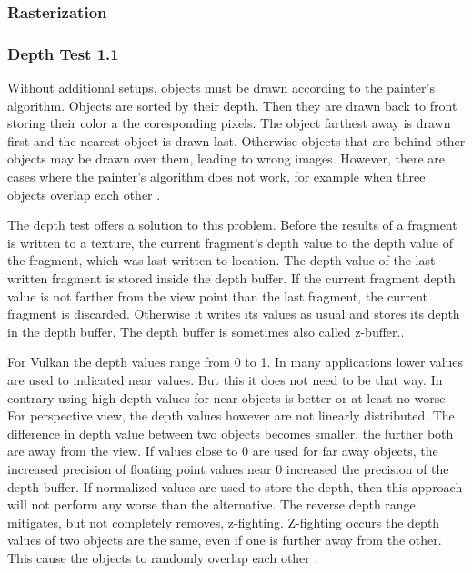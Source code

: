 \subsubsection{Rasterization}

\subsubsection{Depth Test 1.1}
\label{section:depthtest}
Without additional setups, objects must be drawn according to the painter's algorithm. Objects are sorted by their depth. Then they are drawn back to front storing their color a the coresponding pixels. The object farthest away is drawn first and the nearest object is drawn last. Otherwise objects that are behind other objects may be drawn over them, leading to wrong images. However, there are cases where the painter's algorithm does not work, for example when three objects overlap each other \cite{akine:2018:realtime}.

The depth test offers a solution to this problem. Before the results of a fragment is written to a texture, the current fragment's depth value to the depth value of the fragment, which was last written to location. The depth value of the last written fragment is stored inside the depth buffer. If the current fragment depth value is not farther from the view point than the last fragment, the current fragment is discarded. Otherwise it writes its values as usual and stores its depth in the depth buffer. The depth buffer is sometimes also called z-buffer.\cite{akine:2018:realtime}.

For Vulkan the depth values range from 0 to 1.  In many applications lower values are used to indicated near values. But this it does not need to be that way. In contrary using high depth values for near objects is better or at least no worse. For perspective view, the depth values however are not linearly distributed. The difference in depth value between two objects becomes smaller, the further both are away from the view. If values close to 0 are used for far away objects, the increased precision of floating point values near 0 increased the precision of the depth buffer. If normalized values are used to store the depth, then this approach will not perform any worse than the alternative\cite{lapidous:1999:optimal, nvidia:inversez}. The reverse depth range mitigates, but not completely removes, z-fighting. Z-fighting occurs the depth values of two objects are the same, even if one is further away from  the other. This cause the objects to randomly overlap each other \cite{akine:2018:realtime}.

